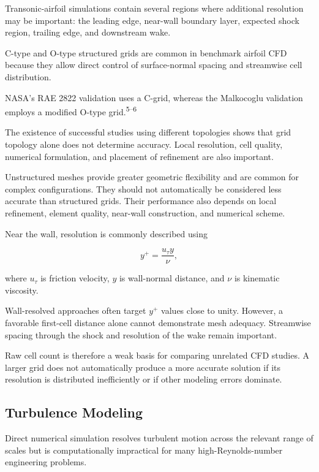 \documentclass[10pt]{article}
\newcommand{\supercite}[1]{\textsuperscript{#1}}
\begin{document}
Transonic-airfoil simulations contain several regions where additional
resolution may be important: the leading edge, near-wall boundary layer,
expected shock region, trailing edge, and downstream wake.

C-type and O-type structured grids are common in benchmark airfoil CFD
because they allow direct control of surface-normal spacing and
streamwise cell distribution.

NASA's RAE 2822 validation uses a C-grid, whereas the Malkocoglu
validation employs a modified O-type grid.\supercite{5--6}

The existence of successful studies using different topologies shows
that grid topology alone does not determine accuracy. Local resolution,
cell quality, numerical formulation, and placement of refinement are
also important.

Unstructured meshes provide greater geometric flexibility and are
common for complex configurations. They should not automatically be
considered less accurate than structured grids. Their performance also
depends on local refinement, element quality, near-wall construction,
and numerical scheme.

Near the wall, resolution is commonly described using

\begin{equation}
y^+ = \frac{u_\tau y}{\nu},
\end{equation}

where $u_\tau$ is friction velocity, $y$ is wall-normal distance, and
$\nu$ is kinematic viscosity.

Wall-resolved approaches often target $y^+$ values close to unity.
However, a favorable first-cell distance alone cannot demonstrate mesh
adequacy. Streamwise spacing through the shock and resolution of the
wake remain important.

Raw cell count is therefore a weak basis for comparing unrelated CFD
studies. A larger grid does not automatically produce a more accurate
solution if its resolution is distributed inefficiently or if other
modeling errors dominate.


\subsection{Turbulence Modeling}

Direct numerical simulation resolves turbulent motion across the
relevant range of scales but is computationally impractical for many
high-Reynolds-number engineering problems.
\end{document}

